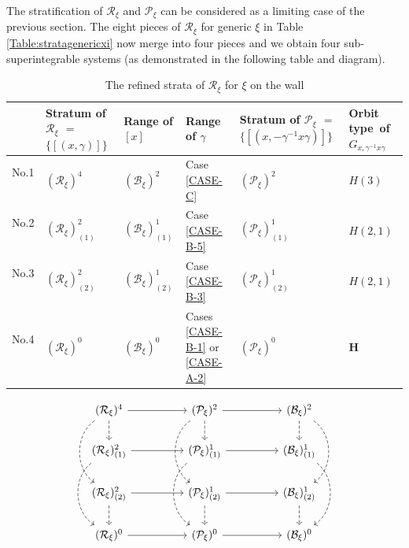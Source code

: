 \documentclass[12pt]{amsart}
\theoremstyle{definition}
\numberwithin{equation}{section}
\newcommand{\Reducedxi}{\mathcal{R}_\xi}
\newcommand{\SET}[1]{\{#1\}}
\newcommand{\Pxi}{\mathcal{P}_{\xi}}
\newcommand{\Bxi}{\mathcal{B}_{\xi}}
\newcommand{\Cartan}{\mathbf{H}}
\begin{document}
{The stratification of  $\Reducedxi  $ and $\Pxi $ can be considered as a limiting case of the previous section.  The eight pieces of $\Reducedxi  $ for generic $\xi$ in Table \ref{Table:stratagenericxi} now merge into four pieces and we obtain four   sub-superintegrable systems (as demonstrated in the following table and diagram).
   
      \begin{table}[H]
 \caption{The refined strata of  $\Reducedxi $   for   $\xi$ on the wall } \label{Table:stratawallxi} 
  \begin{supertabular}{|p{0.9cm}|p{2.4cm}|p{2.4cm}|p{2.1cm}|  p{3cm} | p{2.5cm}   |  }
 \hline
 &
 Stratum of   $\Reducedxi $ $=$ $\SET{[(x,\gamma)]}$   & Range of $[x]$ & Range of $\gamma$	   &  Stratum of   $\Pxi $ $=$ $\SET{[(x,-\gamma^{-1}x\gamma)]}$  &   Orbit~ type~of $G_{x,\gamma^{-1}x\gamma}$ \\  
 
 \hline No.1 ~& 
  $(\Reducedxi)^4$ 	& $ (\Bxi)^2   $ & Case \eqref{CASE-C}     & $(\Pxi)^2$  & $H(3)$ \\ 
\hline  No.2 ~& 
  $(\Reducedxi)^2_{(1)}$ &	$ (\Bxi)^1_{(1)}  $ & Case \eqref{CASE-B-5}     &  $(\Pxi)^1_{(1)}$ &  $H(2,1)$  \\
  \hline  No.3 ~& 
  $(\Reducedxi)^2_{(2)}$ &	$ (\Bxi)^1_{(2)}  $ & Case \eqref{CASE-B-3}     &  $(\Pxi)^1_{(2)}$ &  $H(2,1)$  \\  
  \hline  No.4 ~& 
  $(\Reducedxi)^0$   &	$(\Bxi)^0$ & Cases \eqref{CASE-B-1}   or   \eqref{CASE-A-2}   &  $(\Pxi)^0$ &  $\Cartan$   \\
  \hline
   \end{supertabular}
\end{table}
   
  
\begin{equation}
	\label{Diagram:SU3arrowsonwallrefined}
	\begin{tikzcd}
		(\Reducedxi)^4\arrow[dd,bend right=55,dashed] \arrow[d,dashed] \arrow[rr] && (\Pxi)^2  \arrow[dd,bend right=55,dashed]\arrow[d,dashed] \arrow[rr]   && (\Bxi)^2    \arrow[d,dashed] \arrow[dd,bend left=55,dashed]  \\
		(\Reducedxi)^2_{(1)}  
\arrow[dd,bend right=55,dashed]\arrow[rr ] && (\Pxi)^1_{(1)} \arrow[dd,bend right=55,dashed]  \arrow[rr ]&& (\Bxi)^1_{(1)}   \arrow[dd,bend left=55,dashed] \\  
		(\Reducedxi)^2_{(2)}  
 \arrow[d, dashed] \arrow[rr ] && (\Pxi)^1_{(2)} \arrow[d, dashed] \arrow[rr ]  && (\Bxi)^1_{(2)}   \arrow[d, dashed]\\  
		(\Reducedxi)^0   
 \arrow[rr ] && (\Pxi)^0  \arrow[rr ]  && (\Bxi)^0      
	\end{tikzcd}
\end{equation} 




}
\end{document}
